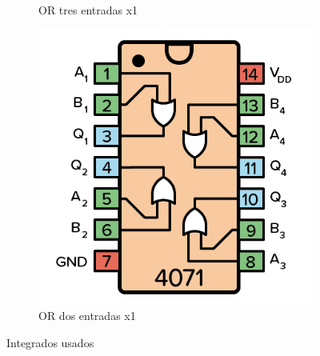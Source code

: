 \begin{center}
\begin{figure}[h!]
\begin{subfigure}[c]{0.45\linewidth}
\caption{OR tres entradas x1}
\end{subfigure}
\begin{subfigure}[d]{0.45\linewidth}
\includegraphics[width=\linewidth]{./imagenes/cd4071.png}
\caption{OR dos entradas x1}
\end{subfigure}
\caption{Integrados usados}
\end{figure}
\end{center}
\thispagestyle{fancy}

\inicioCodigo{}
